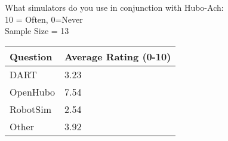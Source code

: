 \begin{table}
\centering
\caption{Q4: Survey on the Unified Algorithmic Framework for Complex System and Humanoids, Hubo-Ach:}\label{table:q4}
What simulators do you use in conjunction with Hubo-Ach:\\
\small
10 = Often, 0=Never\\
Sample Size = 13\\
\normalsize
\begin{longtable}{|p{9cm} | p{3cm} | }
\hline
Question	&	Average Rating (0-10)	\\	\hline
\hline
\hline
DART		& 	3.23 \\
\hline
OpenHubo	&	7.54\\
\hline
RobotSim	&	2.54 \\
\hline		
Other		&	3.92 \\
\hline


\end{longtable}
\end{table}
